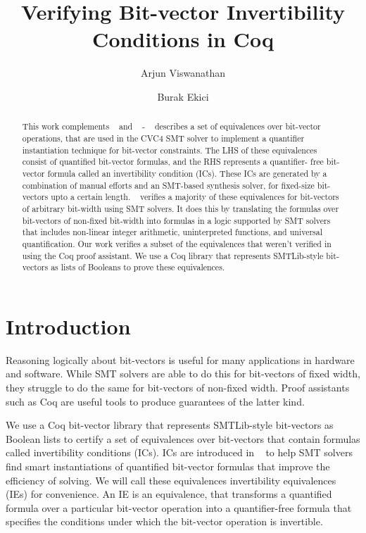 \documentclass[submission,copyright,creativecommons]{eptcs}
\title{Verifying Bit-vector Invertibility Conditions in Coq}
\author{Arjun Viswanathan
\institute{University of Iowa\\ Iowa City, USA}
\email{arjun-viswanathan@uiowa.edu}
\and
Burak Ekici
\institute{University of Innsbruck\\
Innsbruck, Austria}
\email{burak.ekici@uibk.ac.at}
}
\begin{document}
\maketitle

\begin{abstract}
This work complements ~\cite{DBLP:conf/cav/NiemetzPRBT18} 
and ~\cite{yoni} - ~\cite{DBLP:conf/cav/NiemetzPRBT18} 
describes a set of equivalences over bit-vector operations,
that are used in the CVC4 SMT solver to implement a 
quantifier instantiation technique for bit-vector constraints.
The LHS of these equivalences consist of quantified 
bit-vector formulas, and the RHS represents a quantifier-
free bit-vector formula called an invertibility condition (ICs).
These ICs are generated by a combination of manual efforts 
and an SMT-based synthesis solver, for fixed-size 
bit-vectors upto a certain length. ~\cite{yoni} verifies a
majority of these equivalences for bit-vectors of arbitrary 
bit-width using SMT solvers. It does this by translating 
the formulas over bit-vectors of non-fixed bit-width into 
formulas in a logic supported by SMT solvers that includes 
non-linear integer arithmetic, uninterpreted functions, and 
universal quantification. Our work verifies a subset of 
the equivalences that weren't verified in ~\cite{yoni} 
using the Coq proof assistant. 
We use a Coq library that represents SMTLib-style 
bit-vectors as lists of Booleans to prove these equivalences.
\end{abstract}

\section{Introduction}
Reasoning logically about bit-vectors is useful for many applications in hardware and software. While SMT solvers 
are able to do this for bit-vectors of fixed width, 
they struggle to do the same for bit-vectors of non-fixed 
width. Proof assistants such as Coq are useful tools to 
produce guarantees of the latter kind.

We use a Coq bit-vector library that represents SMTLib-style 
bit-vectors as Boolean lists to certify a set of equivalences 
over bit-vectors that contain formulas called invertibility
conditions (ICs). ICs are introduced in 
~\cite{DBLP:conf/cav/NiemetzPRBT18} to 
help SMT solvers find smart instantiations of quantified
bit-vector formulas that improve the efficiency of solving.
We will call these equivalences invertibility equivalences 
(IEs) for convenience. An IE is an equivalence, 
that transforms a quantified formula over a particular
bit-vector operation into a quantifier-free formula that
specifies the conditions under which the bit-vector 
operation is invertible. 
\end{document}
